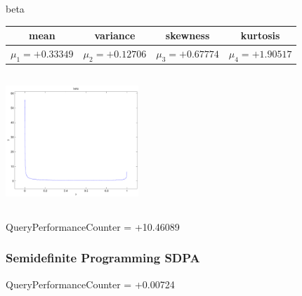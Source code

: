 \documentclass[9pt]{article}
\theoremstyle{plain}
\theoremstyle{definition}
\theoremstyle{remark}
\numberwithin{equation}{section}
\begin{document}
\newpage
beta \begin{tabular}{|c|c|c|c|}  mean & variance & skewness & kurtosis \\  \hline
$\mu_1 = +0.33349$ & $\mu_2 = +0.12706$ & $\mu_3 = +0.67774$ & $\mu_4 =+1.90517$ \\
\end{tabular}

\includegraphics[width=5cm,height=5cm]{beta.pdf}

QueryPerformanceCounter  =  +10.46089
\subsubsection{Semidefinite Programming SDPA}
QueryPerformanceCounter  =  +0.00724
\end{document}
